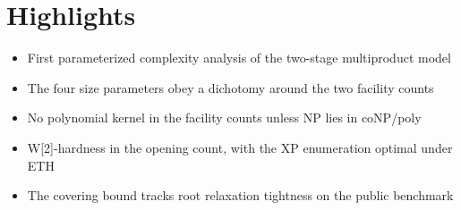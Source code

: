 \documentclass{article}
\begin{document}
\section*{Highlights}
\begin{itemize}
\item First parameterized complexity analysis of the two-stage
multiproduct model
\item The four size parameters obey a dichotomy around the two facility
counts
\item No polynomial kernel in the facility counts unless NP lies in
coNP/poly
\item W[2]-hardness in the opening count, with the XP enumeration
optimal under ETH
\item The covering bound tracks root relaxation tightness on the public
benchmark
\end{itemize}
\end{document}
